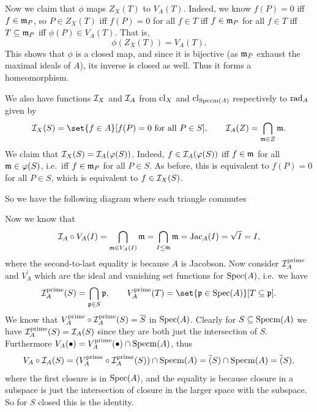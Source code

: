     Now we claim that $\phi$ maps $Z_X(T)$ to $V_A(T)$.
    Indeed, we know $f(P)=0$ iff $f\in{{\frak m}}_P$, so $P\in Z_X(T)$ iff $f(P)=0$ for all $f\in T$ iff $f\in{{\frak m}}_P$ for all $f\in T$
    iff $T\subseteq{{\frak m}}_P$ iff $\phi(P)\in V_A(T)$.
    That is,
    $$ \phi(Z_X(T)) = V_A(T) . $$
    This shows that $\phi$ is a closed map, and since it is bijective (as ${{\frak m}}_P$ exhaust the maximal ideals of $A$), its inverse is closed as well.
    Thus it forms a homeomorphism.

    We also have functions ${{\cal I}}_X$ and ${{\cal I}}_A$ from ${\rm cl}_X$ and ${\rm cl}_{{\rm Specm}(A)}$ respectively to ${\rm rad}_A$ given by
    $$ \I_X(S) = \set{f\in A}[f(P)=0\hbox{ for all $P\in S$}],\qquad \I_A(Z) = \bigcap_{\m\in Z}\m . $$
    We claim that ${{\cal I}}_X(S)={{\cal I}}_A(\varphi(S))$.
    Indeed, $f\in{{\cal I}}_A(\varphi(S))$ iff $f\in{{\frak m}}$ for all ${{\frak m}}\in\varphi(S)$, i.e.\ iff $f\in{{\frak m}}_P$ for all $P\in S$.
    As before, this is equivalent to $f(P)=0$ for all $P\in S$, which is equivalent to $f\in{{\cal I}}_X(S)$.

    So we have the following diagram where each triangle commutes

    \bigskip
    \centerline{}

    Now we know that
    $$ {{\cal I}}_A\circ V_A(I) = \bigcap_{{{\frak m}}\in V_A(I)}{{\frak m}} = \bigcap_{I\leq{{\frak m}}}{{\frak m}} = {\rm Jac}_A(I) = \sqrt I = I , $$
    where the second-to-last equality is because $A$ is Jacobson.
    Now consider ${{\cal I}}_A^{\rm prime}$ and $V_A^\prime$ which are the ideal and vanishing set functions for ${\rm Spec}(A)$, i.e.\ we have
    $$ \I_A^\prime(S) = \bigcap_{\p\in S}\p,\qquad V_A^\prime(T) = \set{\p\in\spec(A)}[T\subseteq\p] . $$
    We know that $V_A^{\rm prime}\circ{{\cal I}}_A^{\rm prime}(S)={\overline{S}}$ in ${\rm Spec}(A)$.
    Clearly for $S\subseteq{\rm Specm}(A)$ we have ${{\cal I}}_A^{\rm prime}(S)={{\cal I}}_A(S)$ since they are both just the intersection of $S$.
    Furthermore $V_A(\bullet)=V_A^{\rm prime}(\bullet)\cap{\rm Specm}(A)$, thus
    $$ V_A\circ{{\cal I}}_A(S) = (V_A^{\rm prime}\circ{{\cal I}}_A^{\rm prime}(S))\cap{\rm Specm}(A) = {\overline{(}}S)\cap{\rm Specm}(A) = {\overline{(}}S) , $$
    where the first closure is in ${\rm Spec}(A)$, and the equality is because closure in a subspace is just the intersection of closure in the larger
    space with the subspace.
    So for $S$ closed this is the identity.

